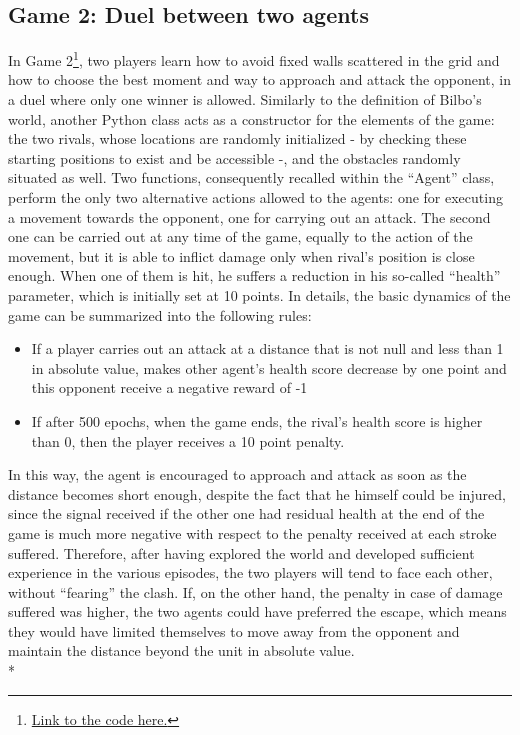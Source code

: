 \subsection{Game 2: Duel between two agents}
In Game 2\footnote{\href{https://github.com/moiraghif/DragonHunting/tree/master/Duel}{Link to the code here.}}, two players learn how to avoid fixed walls scattered in the grid and how to choose the best moment and way to approach and attack the opponent, in a duel where only one winner is allowed. Similarly to the definition of Bilbo's world, another Python class acts as a constructor for the elements of the game: the two rivals, whose locations are randomly initialized - by checking these starting positions to exist and be accessible -, and the obstacles randomly situated as well. Two functions, consequently recalled within the ``Agent'' class, perform the only two alternative actions allowed to the agents: one for executing a movement towards the opponent, one for carrying out an attack. The second one can be carried out at any time of the game, equally to the action of the movement, but it is able to inflict damage only when rival's position is close enough. When one of them is hit, he suffers a reduction in his so-called ``health'' parameter, which is initially set at 10 points. In details, the basic dynamics of the game can be summarized into the following rules:
\begin{itemize}[noitemsep, topsep=0ex]
  \item If a player carries out an attack at a distance that is not null and less than 1 in absolute value, makes other agent's health score decrease by one point and this opponent receive a negative reward of -1
  \item If after 500 epochs, when the game ends, the rival's health score is higher than 0, then the player receives a 10 point penalty.
\end{itemize}
In this way, the agent is encouraged to approach and attack as soon as the distance becomes short enough, despite the fact that he himself could be injured, since the signal received if the other one had residual health at the end of the game is much more negative with respect to the penalty received at each stroke suffered. Therefore, after having explored the world and developed sufficient experience in the various episodes, the two players will tend to face each other, without ``fearing'' the clash. If, on the other hand, the penalty in case of damage suffered was higher, the two agents could have preferred the escape, which means they would have limited themselves to move away from the opponent and maintain the distance beyond the unit in absolute value.\\*
